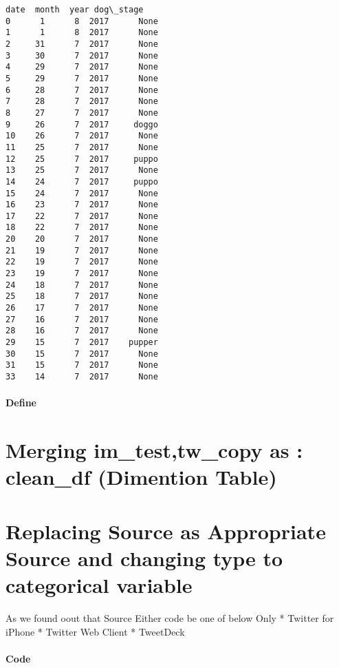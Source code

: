 \documentclass[11pt]{article}
\begin{document}
\begin{Verbatim}[commandchars=\\\{\}]
    date  month  year dog\_stage  
0      1      8  2017      None  
1      1      8  2017      None  
2     31      7  2017      None  
3     30      7  2017      None  
4     29      7  2017      None  
5     29      7  2017      None  
6     28      7  2017      None  
7     28      7  2017      None  
8     27      7  2017      None  
9     26      7  2017     doggo  
10    26      7  2017      None  
11    25      7  2017      None  
12    25      7  2017     puppo  
13    25      7  2017      None  
14    24      7  2017     puppo  
15    24      7  2017      None  
16    23      7  2017      None  
17    22      7  2017      None  
18    22      7  2017      None  
20    20      7  2017      None  
21    19      7  2017      None  
22    19      7  2017      None  
23    19      7  2017      None  
24    18      7  2017      None  
25    18      7  2017      None  
26    17      7  2017      None  
27    16      7  2017      None  
28    16      7  2017      None  
29    15      7  2017    pupper  
30    15      7  2017      None  
31    15      7  2017      None  
33    14      7  2017      None  

    \end{Verbatim}

    \paragraph{Define}\label{define}

\section{Merging im\_test,tw\_copy as : clean\_df (Dimention
Table)}\label{merging-im_testtw_copy-as-clean_df-dimention-table}

\section{Replacing Source as Appropriate Source and changing type to
categorical
variable}\label{replacing-source-as-appropriate-source-and-changing-type-to-categorical-variable}

As we found oout that Source Either code be one of below Only * Twitter
for iPhone * Twitter Web Client * TweetDeck

    \paragraph{Code}\label{code}
\end{document}
